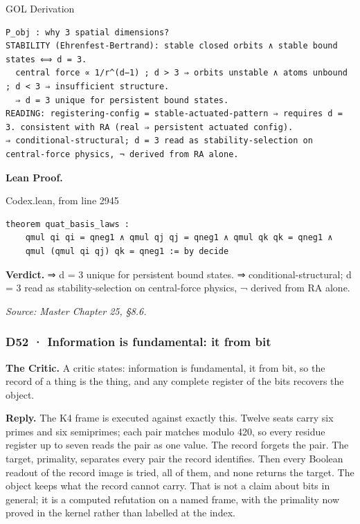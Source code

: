 \documentclass[10pt,twocolumn]{article}
\begin{document}
\begin{golbox}{GOL Derivation}
\begin{lstlisting}[style=golv]
P_obj : why 3 spatial dimensions?
STABILITY (Ehrenfest-Bertrand): stable closed orbits ∧ stable bound states ⟺ d = 3.
  central force ∝ 1/r^(d−1) ; d > 3 ⇒ orbits unstable ∧ atoms unbound ; d < 3 ⇒ insufficient structure.
  ⇒ d = 3 unique for persistent bound states.
READING: registering-config = stable-actuated-pattern ⇒ requires d = 3. consistent with RA (real ⇒ persistent actuated config).
⇒ conditional-structural; d = 3 read as stability-selection on central-force physics, ¬ derived from RA alone.
\end{lstlisting}
\end{golbox}

\textbf{Lean Proof.}

\begin{leanexcerpt}{Codex.lean, from line 2945}
\begin{lstlisting}[style=leanx,firstnumber=2945]
theorem quat_basis_laws :
    qmul qi qi = qneg1 ∧ qmul qj qj = qneg1 ∧ qmul qk qk = qneg1 ∧
    qmul (qmul qi qj) qk = qneg1 := by decide
\end{lstlisting}
\end{leanexcerpt}

\textbf{Verdict.} ⇒ d = 3 unique for persistent bound states. ⇒
conditional-structural; d = 3 read as stability-selection on
central-force physics, ¬ derived from RA alone.

\emph{Source: Master Chapter 25, §8.6.}

\hypertarget{d52-information-is-fundamental-it-from-bit}{%
\subsubsection{D52 · Information is fundamental: it from
bit}\label{d52-information-is-fundamental-it-from-bit}}

\textbf{The Critic.} A critic states: information is fundamental, it
from bit, so the record of a thing is the thing, and any complete
register of the bits recovers the object.

\textbf{Reply.} The K4 frame is executed against exactly this. Twelve
seats carry six primes and six semiprimes; each pair matches modulo 420,
so every residue register up to seven reads the pair as one value. The
record forgets the pair. The target, primality, separates every pair the
record identifies. Then every Boolean readout of the record image is
tried, all of them, and none returns the target. The object keeps what
the record cannot carry. That is not a claim about bits in general; it
is a computed refutation on a named frame, with the primality now proved
in the kernel rather than labelled at the index.
\end{document}
